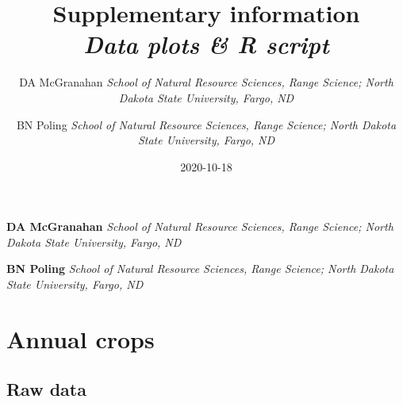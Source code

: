 \documentclass[]{scrartcl}
\title{Supplementary information \newline \\ \Large \emph{Data plots \& R script}   }
\date{2020-10-18}
\author{\Large DA McGranahan  \normalsize \emph{School of Natural Resource Sciences, Range Science; North Dakota State
University, Fargo, ND}   \and \Large BN Poling  \normalsize \emph{School of Natural Resource Sciences, Range Science; North Dakota State
University, Fargo, ND}  }
\newcommand*{\authorfont}{\fontfamily{phv}\selectfont}
\begin{document}
	
%

{%
\setlength{\parindent}{0pt}
\thispagestyle{plain}
{\fontsize{18}{20}\selectfont\raggedright 
\maketitle  %
}


{
   \vskip 13.5pt\relax \normalsize\fontsize{11}{12} 
\textbf{\authorfont DA McGranahan} \newline \hspace{0.1in} \vspace{0.05in}  \emph{\small School of Natural Resource Sciences, Range Science; North Dakota State
University, Fargo, ND}   \par \textbf{\authorfont BN Poling} \newline \hspace{0.1in} \vspace{0.05in}  \emph{\small School of Natural Resource Sciences, Range Science; North Dakota State
University, Fargo, ND}   

}

}


\date{}



\vskip 6.5pt

\noindent  \newpage

\hypertarget{annual-crops}{%
\section{Annual crops}\label{annual-crops}}

\hypertarget{raw-data}{%
\subsection{Raw data}\label{raw-data}}
\end{document}

